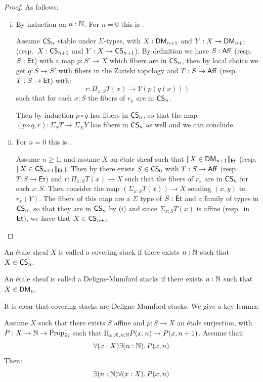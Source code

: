 \begin{proof}
As follows:

\begin{enumerate}[(i)]
\item By induction on $n:\mathbb{N}$. For $n=0$ this is .

Assume $\mathsf{CS}_n$ stable under $\Sigma$-types, with $X:\mathsf{DM}_{n+1}$ and $Y:X\to \mathsf{DM}_{n+1}$ (resp.\ $X:\mathsf{CS}_{n+1}$ and $Y:X\to \mathsf{CS}_{n+1}$). By definition we have $S:\mathsf{Aff}$ (resp. $S:\mathsf{Et}$) with a map $p:S'\to X$ which fibers are in $\mathsf{CS}_{n}$, then by local choice we get $q:S\to S'$ with fibers in the Zariski topology and $T:S\to \mathsf{Aff}$ (resp. $T:S\to\mathsf{Et}$) with:
\[r:\Pi_{x:S} T(x)\to Y(p(q(x)))\]
such that for each $x:S$ the fibers of $r_x$ are in $\mathsf{CS}_n$.

Then by induction $p\circ q$ has fibers in $\mathsf{CS}_n$, so that the map $(p\circ q, r) : \Sigma_ST\to \Sigma_XY$ has fibers in $\mathsf{CS}_n$ as well and we can conclude.
\item For $n=0$ this is .

Assume $n\geq 1$, and assume $X$ an étale sheaf such that $\lVert X\in \mathsf{DM}_{n+1} \rVert_{\mathsf{Et}}$ (resp.\, $\lVert X\in \mathsf{CS}_{n+1} \rVert_{\mathsf{Et}}$). Then by  there exists $S\in \mathsf{CS}_0$ with $T:S\to \mathsf{Aff}$ (resp.\ $T:S\to \mathsf{Et}$) and $r:\Pi_{x:S}T(x)\to X$ such that the fibers of $r_x$ are in $\mathsf{CS}_n$ for each $x:S$. Then consider the map $(\Sigma_{x:S}T(x)) \to X$ sending $(x,y)$ to $r_x(Y)$. The fibers of this map are a $\Sigma$ type of $S:\mathsf{Et}$ and a family of types in $\mathsf{CS}_n$, so that they are in $\mathsf{CS}_n$ by (i) and since $\Sigma_{x:S}T(x)$ is affine (resp.\ in $\mathsf{Et}$), we have that $X\in \mathsf{CS}_{n+1}$.
\end{enumerate}
\end{proof}

\begin{definition}
An étale sheaf $X$ is called a covering stack if there exists $n:\mathbb{N}$ such that $X\in \mathsf{CS}_n$.
\end{definition}

\begin{definition}
An étale sheaf is called a Deligne-Mumford stacks if there exists $n:\mathbb{N}$ such that $X\in\mathsf{DM}_n$.
\end{definition}

It is clear that covering stacks are Deligne-Mumford stacks. We give a key lemma:

\begin{lemma}\label{DM-boundedness}
Assume $X$ such that there exists $S$ affine and $p:S\to X$ an étale surjection, with $P:X\to\mathbb{N}\to \mathrm{Prop}_{\mathsf{Et}}$ such that $\Pi_{x:X,n:\mathbb{N}} P(x,n)\to P(x,n+1)$. Assume that:
\[\forall(x:X)\exists(n:\mathbb{N}).\, P(x,n)\]
Then:
\[\exists(n:\mathbb{N})\forall(x:X).\, P(x,n)\]
\end{lemma}

